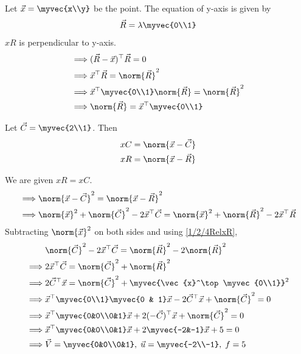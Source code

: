 Let $\vec{x} = \myvec{x\\y}$ be the point. The equation of y-axis is given by
\begin{equation}
    \vec{R} = \lambda \myvec{0\\1}
\end{equation}
$xR$ is perpendicular to y-axis.
\begin{align}
    \implies &(\vec{R} - \vec{x})^\top \vec{R} = 0\\
    \implies &\vec{x}^\top \vec{R} = \norm{\vec{R}}^2\label{1/2/4RelxR}\\
    \implies &\vec{x}^\top \myvec{0\\1}\norm{\vec{R}} = \norm{\vec{R}}^2\\
    \implies &\norm{\vec{R}} = \vec{x}^\top \myvec{0\\1}
\end{align}

Let $\vec{C} = \myvec{2\\1}$. Then
\begin{align}
     xC &= \norm{\vec{x} - \vec{C}}\\
     xR &= \norm{\vec{x} - \vec{R}}
\end{align}

We are given $xR = xC$.  
\begin{align}
    \implies &\norm{\vec{x} - \vec{C}}^2 = \norm{\vec{x} - \vec{R}}^2\\ 
    \implies &\norm{\vec{x}}^2+\norm{\vec{C}}^2-2\vec{x}^\top \vec{C} = \norm{\vec{x}}^2+\norm{\vec{R}}^2-2\vec{x}^\top \vec{R}
\end{align}
Subtracting $\norm{\vec{x}}^2$ on both sides and using \ref{1/2/4RelxR},
\begin{align}
    &\norm{\vec{C}}^2-2\vec{x}^\top \vec{C} = \norm{\vec{R}}^2 - 2\norm{\vec{R}}^2\\
    \implies &2\vec{x}^\top \vec{C} = \norm{\vec{C}}^2+\norm{\vec{R}}^2\\
    \implies &2\vec{C}^\top \vec{x} = \norm{\vec{C}}^2+\myvec{\vec{x}^\top \myvec{0\\1}}^2\\
    \implies &\vec{x}^\top \myvec{0\\1} \myvec{0 & 1} \vec{x} - 2\vec{C}^\top \vec{x} + \norm{\vec{C}}^2 = 0\\
    \implies &\vec{x}^\top \myvec{0&0\\0&1}\vec{x} + 2(-\vec{C})^\top\vec{x} + \norm{\vec{C}}^2 = 0\\
    \implies &\vec{x}^\top \myvec{0&0\\0&1}\vec{x} + 2\myvec{-2&-1}\vec{x} + 5 = 0\\
    \implies &\vec{V} = \myvec{0&0\\0&1},\; \vec{u} = \myvec{-2\\-1},\; f = 5
\end{align}

